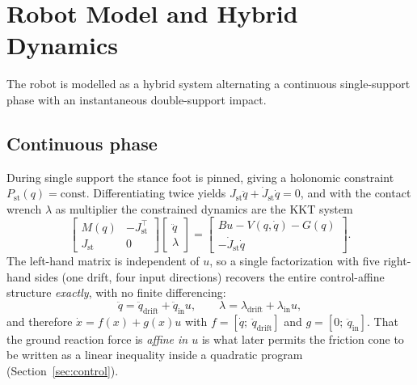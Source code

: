 \documentclass[10pt,conference]{IEEEtran}
\begin{document}
\section{Robot Model and Hybrid Dynamics}

The robot is modelled as a hybrid system alternating a continuous single-support
phase with an instantaneous double-support impact.

\subsection{Continuous phase}

During single support the stance foot is pinned, giving a holonomic constraint
$P_{\mathrm{st}}(q) = \text{const}$. Differentiating twice yields
$J_{\mathrm{st}}\ddot q + \dot J_{\mathrm{st}}\dot q = 0$, and with the contact
wrench $\lambda$ as multiplier the constrained dynamics are the KKT system
%
\begin{equation}
\begin{bmatrix} M(q) & -J_{\mathrm{st}}^\top \\ J_{\mathrm{st}} & 0 \end{bmatrix}
\begin{bmatrix} \ddot q \\ \lambda \end{bmatrix}
=
\begin{bmatrix} Bu - V(q,\dot q) - G(q) \\ -\dot J_{\mathrm{st}}\dot q \end{bmatrix}.
\label{eq:kkt}
\end{equation}
%
The left-hand matrix is independent of $u$, so a single factorization with five
right-hand sides (one drift, four input directions) recovers the entire
control-affine structure \emph{exactly}, with no finite differencing:
%
\begin{equation}
\ddot q = \ddot q_{\mathrm{drift}} + \ddot q_{\mathrm{in}} u, \qquad
\lambda = \lambda_{\mathrm{drift}} + \lambda_{\mathrm{in}} u,
\end{equation}
%
and therefore $\dot x = f(x) + g(x)u$ with
$f = [\dot q;\ \ddot q_{\mathrm{drift}}]$ and
$g = [0;\ \ddot q_{\mathrm{in}}]$. That the ground reaction force is
\emph{affine in $u$} is what later permits the friction cone to be written as a
linear inequality inside a quadratic program (Section~\ref{sec:control}).
\end{document}

